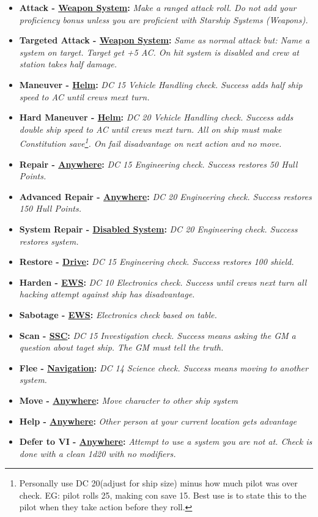\begin{scifitablebox}[screenbox,title=\textcolor{PanelGlow}{Actions}]
\begin{itemize}
    \item \textbf{Attack - \underline{Weapon System}:} \textit{Make a ranged attack roll. Do not add your proficiency bonus unless you are proficient with Starship Systems (Weapons).} 
    \item \textbf{Targeted Attack - \underline{Weapon System}:} \textit{Same as normal attack but: Name a system on target. Target get +5 AC. On hit system is disabled and crew at station takes half damage.}
    \item \textbf{Maneuver - \underline{Helm}:} \textit{DC 15 Vehicle Handling check. Success adds half ship speed to AC until crews mext turn.}
    \item \textbf{Hard Maneuver - \underline{Helm}:} \textit{DC 20 Vehicle Handling check. Success adds double ship speed to AC until crews mext turn. All on ship must make Constitution save\footnote{Personally use DC 20(adjust for ship size) minus how much pilot was over check. EG: pilot rolls 25, making con save 15. Best use is to state this to the pilot when they take action before they roll.}. On fail disadvantage on next action and no move.}
    \item \textbf{Repair - \underline{Anywhere}:} \textit{DC 15 Engineering check. Success restores 50 Hull Points.}
    \item \textbf{Advanced Repair - \underline{Anywhere}:} \textit{DC 20 Engineering check. Success restores 150 Hull Points.}
    \item \textbf{System Repair - \underline{Disabled System}:} \textit{DC 20 Engineering check. Success restores system.}
    \item \textbf{Restore - \underline{Drive}:} \textit{DC 15 Engineering check. Success restores 100 shield.}
    \item \textbf{Harden - \underline{EWS}:} \textit{DC 10 Electronics check. Success until crews next turn all hacking attempt against ship has disadvantage.}
    \item \textbf{Sabotage - \underline{EWS}:} \textit{Electronics check based on table.}
    \item \textbf{Scan - \underline{SSC}:} \textit{DC 15 Investigation check. Success means asking the GM a question about taget ship. The GM must tell the truth.}
    \item \textbf{Flee - \underline{Navigation}:} \textit{DC 14 Science check. Success means moving to another system.}
    \item \textbf{Move - \underline{Anywhere}:} \textit{Move character to other ship system}
    \item \textbf{Help - \underline{Anywhere}:} \textit{Other person at your current location gets advantage}
    \item \textbf{Defer to VI - \underline{Anywhere}:} \textit{Attempt to use a system you are not at. Check is done with a clean 1d20 with no modifiers.}
\end{itemize}
\end{scifitablebox}
